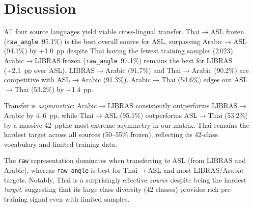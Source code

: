 \documentclass[11pt,a4paper]{article}
\begin{document}
\vspace{-0.5em}
\section*{Discussion}
\vspace{-0.5em}

\begin{sloppypar}
All four source languages yield viable cross-lingual transfer.
Thai$\rightarrow$ASL frozen ({\texttt{raw\_angle}}~95.1\%) is the best
overall source for ASL, surpassing Arabic$\rightarrow$ASL (94.1\%) by
+1.0~pp despite Thai having the fewest training samples (2\,023).
Arabic$\rightarrow$LIBRAS frozen ({\texttt{raw\_angle}}~97.1\%) remains
the best for LIBRAS (+2.1~pp over ASL).
LIBRAS$\rightarrow$Arabic (91.7\%) and Thai$\rightarrow$Arabic (90.2\%)
are competitive with ASL$\rightarrow$Arabic (91.3\%).
Arabic$\rightarrow$Thai (54.6\%) edges out ASL$\rightarrow$Thai (53.2\%)
by +1.4~pp.
\end{sloppypar}

Transfer is \emph{asymmetric}: Arabic$\rightarrow$LIBRAS consistently
outperforms LIBRAS$\rightarrow$Arabic by 4--6~pp, while
Thai$\rightarrow$ASL (95.1\%) outperforms ASL$\rightarrow$Thai (53.2\%)
by a massive 42~pp\textemdash the most extreme asymmetry in our matrix.
Thai remains the hardest target across all sources (50--55\% frozen),
reflecting its 42-class vocabulary and limited training data.

The \texttt{raw} representation dominates when transferring \emph{to} ASL
(from LIBRAS and Arabic), whereas \texttt{raw\_angle} is best for
Thai$\rightarrow$ASL and most LIBRAS/Arabic targets.
Notably, Thai is a surprisingly effective \emph{source} despite being
the hardest \emph{target}, suggesting that its large class diversity
(42 classes) provides rich pre-training signal even with limited samples.
\end{document}
